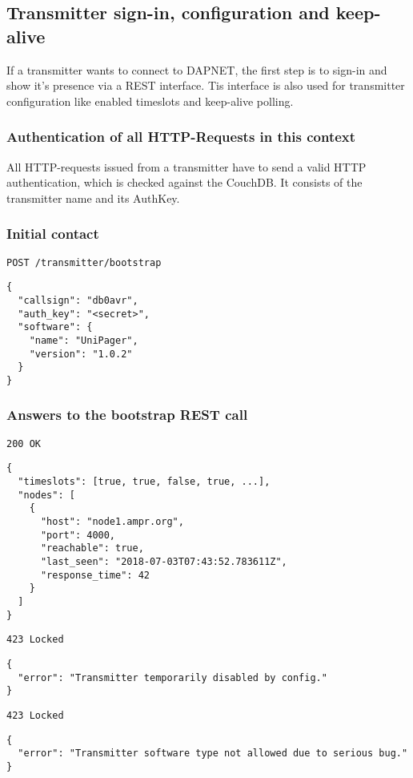 \documentclass[a4paper]{article}
\begin{document}
\subsection{Transmitter sign-in, configuration and keep-alive}
If a transmitter wants to connect to DAPNET, the first step is to sign-in and show it's presence via a REST interface. Tis interface is also used for transmitter configuration like enabled timeslots and keep-alive polling.

\subsubsection{Authentication of all HTTP-Requests in this context}
All HTTP-requests issued from a transmitter have to send a valid HTTP authentication, which is checked against the CouchDB. It consists of the transmitter name and its AuthKey.


\subsubsection{Initial contact}

\texttt{POST /transmitter/bootstrap}
\begin{lstlisting}
{
  "callsign": "db0avr",
  "auth_key": "<secret>",
  "software": {
    "name": "UniPager",
    "version": "1.0.2"
  }
}
\end{lstlisting}

\subsubsection{Answers to the bootstrap REST call}

\texttt{200 OK}
\begin{lstlisting}
{
  "timeslots": [true, true, false, true, ...],
  "nodes": [
    {
      "host": "node1.ampr.org",
      "port": 4000,
      "reachable": true,
      "last_seen": "2018-07-03T07:43:52.783611Z",
      "response_time": 42
    }
  ]
}
\end{lstlisting}

\texttt{423 Locked}
\begin{lstlisting}
{
  "error": "Transmitter temporarily disabled by config."
}
\end{lstlisting}

\texttt{423 Locked}
\begin{lstlisting}
{
  "error": "Transmitter software type not allowed due to serious bug."
}
\end{lstlisting}
\end{document}
